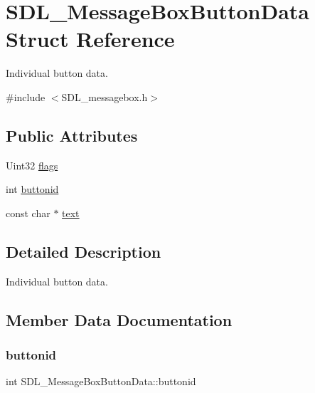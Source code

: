 \hypertarget{struct_s_d_l___message_box_button_data}{}\section{S\+D\+L\+\_\+\+Message\+Box\+Button\+Data Struct Reference}
\label{struct_s_d_l___message_box_button_data}


Individual button data.  




{\ttfamily \#include $<$S\+D\+L\+\_\+messagebox.\+h$>$}

\subsection*{Public Attributes}
\begin{DoxyCompactItemize}
\item 
Uint32 \mbox{\hyperlink{struct_s_d_l___message_box_button_data_a426c8b5da0e718242c7840706d95de0b}{flags}}
\item 
int \mbox{\hyperlink{struct_s_d_l___message_box_button_data_a22938886a6b13792006cc5c91fa38e92}{buttonid}}
\item 
const char $\ast$ \mbox{\hyperlink{struct_s_d_l___message_box_button_data_af35f3062f0577159284c8828caaf08e4}{text}}
\end{DoxyCompactItemize}


\subsection{Detailed Description}
Individual button data. 

\subsection{Member Data Documentation}
\mbox{\label{struct_s_d_l___message_box_button_data_a22938886a6b13792006cc5c91fa38e92}} 
\subsubsection{\texorpdfstring{buttonid}{buttonid}}
{\footnotesize\ttfamily int S\+D\+L\+\_\+\+Message\+Box\+Button\+Data\+::buttonid}

